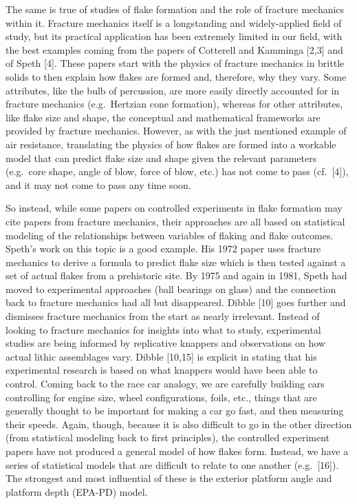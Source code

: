 \documentclass[10pt,letterpaper]{article}
\begin{document}
The same is true of studies of flake formation and the role of fracture
mechanics within it. Fracture mechanics itself is a longstanding and
widely-applied field of study, but its practical application has been
extremely limited in our field, with the best examples coming from the
papers of Cotterell and Kamminga {[}2,3{]} and of Speth {[}4{]}. These
papers start with the physics of fracture mechanics in brittle solids to
then explain how flakes are formed and, therefore, why they vary. Some
attributes, like the bulb of percussion, are more easily directly
accounted for in fracture mechanics (e.g.~Hertzian cone formation),
whereas for other attributes, like flake size and shape, the conceptual
and mathematical frameworks are provided by fracture mechanics. However,
as with the just mentioned example of air resistance, translating the
physics of how flakes are formed into a workable model that can predict
flake size and shape given the relevant parameters (e.g.~core shape,
angle of blow, force of blow, etc.) has not come to pass (cf.~{[}4{]}),
and it may not come to pass any time soon.

So instead, while some papers on controlled experiments in flake
formation may cite papers from fracture mechanics, their approaches are
all based on statistical modeling of the relationships between variables
of flaking and flake outcomes. Speth's work on this topic is a good
example. His 1972 paper uses fracture mechanics to derive a formula to
predict flake size which is then tested against a set of actual flakes
from a prehistoric site. By 1975 and again in 1981, Speth had moved to
experimental approaches (ball bearings on glass) and the connection back
to fracture mechanics had all but disappeared. Dibble {[}10{]} goes
further and dismisses fracture mechanics from the start as nearly
irrelevant. Instead of looking to fracture mechanics for insights into
what to study, experimental studies are being informed by replicative
knappers and observations on how actual lithic assemblages vary. Dibble
{[}10,15{]} is explicit in stating that his experimental research is
based on what knappers would have been able to control. Coming back to
the race car analogy, we are carefully building cars controlling for
engine size, wheel configurations, foils, etc., things that are
generally thought to be important for making a car go fast, and then
measuring their speeds. Again, though, because it is also difficult to
go in the other direction (from statistical modeling back to first
principles), the controlled experiment papers have not produced a
general model of how flakes form. Instead, we have a series of
statistical models that are difficult to relate to one another
(e.g.~{[}16{]}). The strongest and most influential of these is the
exterior platform angle and platform depth (EPA-PD) model.
\end{document}
